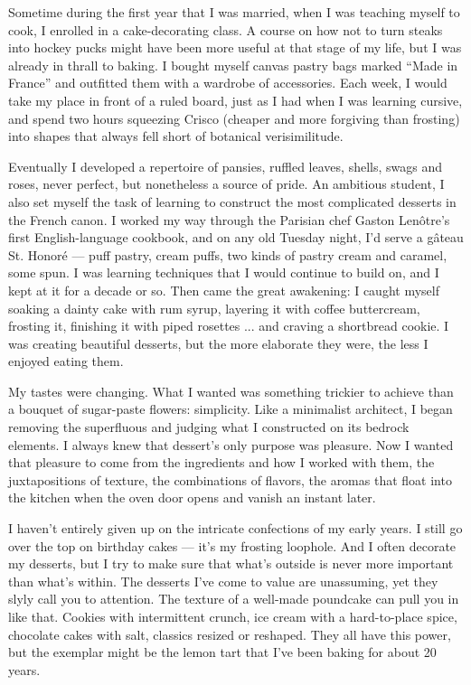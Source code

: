 Sometime during the first year that I was married, when I was teaching
myself to cook, I enrolled in a cake-decorating class. A course on how
not to turn steaks into hockey pucks might have been more useful at that
stage of my life, but I was already in thrall to baking. I bought myself
canvas pastry bags marked ``Made in France'' and outfitted them with a
wardrobe of accessories. Each week, I would take my place in front of a
ruled board, just as I had when I was learning cursive, and spend two
hours squeezing Crisco (cheaper and more forgiving than frosting) into
shapes that always fell short of botanical verisimilitude.

Eventually I developed a repertoire of pansies, ruffled leaves, shells,
swags and roses, never perfect, but nonetheless a source of pride. An
ambitious student, I also set myself the task of learning to construct
the most complicated desserts in the French canon. I worked my way
through the Parisian chef Gaston Lenôtre's first English-language
cookbook, and on any old Tuesday night, I'd serve a gâteau St. Honoré
--- puff pastry, cream puffs, two kinds of pastry cream and caramel,
some spun. I was learning techniques that I would continue to build on,
and I kept at it for a decade or so. Then came the great awakening: I
caught myself soaking a dainty cake with rum syrup, layering it with
coffee buttercream, frosting it, finishing it with piped rosettes ...
and craving a shortbread cookie. I was creating beautiful desserts, but
the more elaborate they were, the less I enjoyed eating them.

My tastes were changing. What I wanted was something trickier to achieve
than a bouquet of sugar-paste flowers: simplicity. Like a minimalist
architect, I began removing the superfluous and judging what I
constructed on its bedrock elements. I always knew that dessert's only
purpose was pleasure. Now I wanted that pleasure to come from the
ingredients and how I worked with them, the juxtapositions of texture,
the combinations of flavors, the aromas that float into the kitchen when
the oven door opens and vanish an instant later.

I haven't entirely given up on the intricate confections of my early
years. I still go over the top on birthday cakes --- it's my frosting
loophole. And I often decorate my desserts, but I try to make sure that
what's outside is never more important than what's within. The desserts
I've come to value are unassuming, yet they slyly call you to attention.
The texture of a well-made poundcake can pull you in like that. Cookies
with intermittent crunch, ice cream with a hard-to-place spice,
chocolate cakes with salt, classics resized or reshaped. They all have
this power, but the exemplar might be the lemon tart that I've been
baking for about 20 years.

